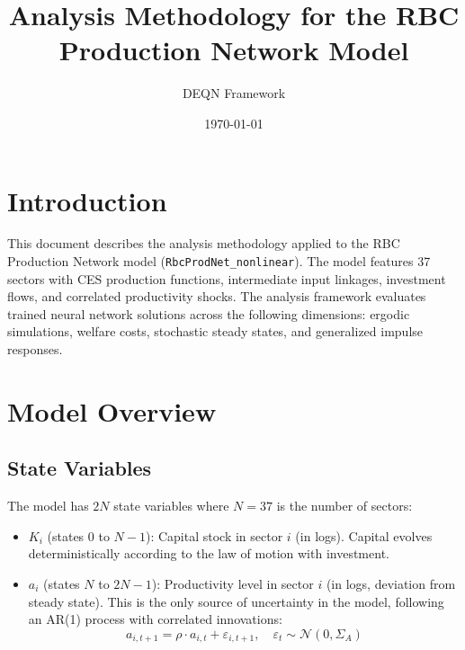 \documentclass[11pt]{article}
\title{Analysis Methodology for the RBC Production Network Model}
\author{DEQN Framework}
\date{\today}
\begin{document}
\maketitle

\section{Introduction}

This document describes the analysis methodology applied to the RBC Production Network model (\texttt{RbcProdNet\_nonlinear}). The model features 37 sectors with CES production functions, intermediate input linkages, investment flows, and correlated productivity shocks. The analysis framework evaluates trained neural network solutions across the following dimensions: ergodic simulations, welfare costs, stochastic steady states, and generalized impulse responses.

\section{Model Overview}

\subsection{State Variables}
The model has $2N$ state variables where $N=37$ is the number of sectors:
\begin{itemize}
    \item $K_i$ (states $0$ to $N-1$): Capital stock in sector $i$ (in logs). Capital evolves deterministically according to the law of motion with investment.
    \item $a_i$ (states $N$ to $2N-1$): Productivity level in sector $i$ (in logs, deviation from steady state). This is the only source of uncertainty in the model, following an AR(1) process with correlated innovations:
    \begin{equation}
        a_{i,t+1} = \rho \cdot a_{i,t} + \varepsilon_{i,t+1}, \quad \varepsilon_t \sim \mathcal{N}(0, \Sigma_A)
    \end{equation}
\end{itemize}
\end{document}
